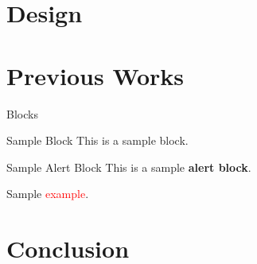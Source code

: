 \documentclass{beamer}
\begin{document}
\section{Design}

\section{Previous Works}
\begin{frame}{Blocks}
    \begin{block}{Sample Block}
    This is a sample block.
    \end{block}
    \begin{alertblock}{Sample Alert Block}
    This is a sample \textbf<2>{alert block}.
    \end{alertblock}
    \begin{example}
    Sample \textcolor<3->{red}{example}.
    \end{example}
\end{frame}
\section{Conclusion}
\end{document}
